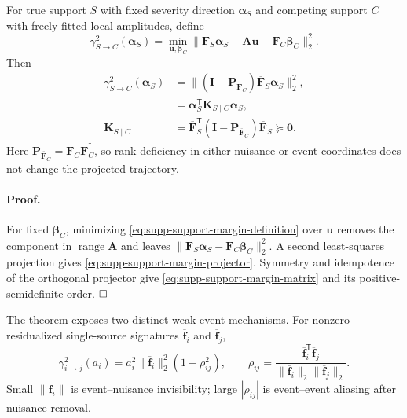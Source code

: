 \begin{theorem}
For true support $S$ with fixed severity direction $\bm\alpha_S$ and competing
support $C$ with freely fitted local amplitudes, define
\begin{equation}
 \gamma_{S\rightarrow C}^2(\bm\alpha_S)
 =\min_{\bm u,\bm\beta_C}
 \|\bm F_S\bm\alpha_S-\bm A\bm u-\bm F_C\bm\beta_C\|_2^2.
 \label{eq:supp-support-margin-definition}
\end{equation}
Then
\begin{align}
 \gamma_{S\rightarrow C}^2(\bm\alpha_S)
 &=\|\left(\bm I-\bm P_{\overline{\bm F}_C}\right)
 \overline{\bm F}_S\bm\alpha_S\|_2^2,
 \label{eq:supp-support-margin-projector}\\
 &=\bm\alpha_S^{\mathsf T}\bm K_{S\mid C}\bm\alpha_S,
 \label{eq:supp-support-margin-matrix}\\
 \bm K_{S\mid C}
 &=\overline{\bm F}_S^{\mathsf T}
 \left(\bm I-\bm P_{\overline{\bm F}_C}\right)
 \overline{\bm F}_S\succeq\bm0.
 \label{eq:supp-support-conditional-matrix}
\end{align}
Here $\bm P_{\overline{\bm F}_C}=\overline{\bm F}_C
\overline{\bm F}_C^{\dagger}$, so rank deficiency in either nuisance or event
coordinates does not change the projected trajectory.
\label{thm:supp-support-separation}
\end{theorem}

\paragraph{Proof.}
For fixed $\bm\beta_C$, minimizing
\eqref{eq:supp-support-margin-definition} over $\bm u$ removes the component in
$\operatorname{range}\bm A$ and leaves
$\|\overline{\bm F}_S\bm\alpha_S-
\overline{\bm F}_C\bm\beta_C\|_2^2$. A second least-squares projection gives
\eqref{eq:supp-support-margin-projector}. Symmetry and idempotence of the
orthogonal projector give \eqref{eq:supp-support-margin-matrix} and its
positive-semidefinite order. $\hfill\square$

The theorem exposes two distinct weak-event mechanisms. For nonzero residualized
single-source signatures $\overline{\bm f}_i$ and
$\overline{\bm f}_j$,
\begin{equation}
 \gamma_{i\rightarrow j}^2(a_i)
 =a_i^2\|\overline{\bm f}_i\|_2^2(1-\rho_{ij}^2),
 \qquad
 \rho_{ij}=\frac{\overline{\bm f}_i^{\mathsf T}
 \overline{\bm f}_j}{\|\overline{\bm f}_i\|_2
 \|\overline{\bm f}_j\|_2}.
 \label{eq:supp-single-source-angle}
\end{equation}
Small $\|\overline{\bm f}_i\|$ is event--nuisance invisibility; large
$|\rho_{ij}|$ is event--event aliasing after nuisance removal.

